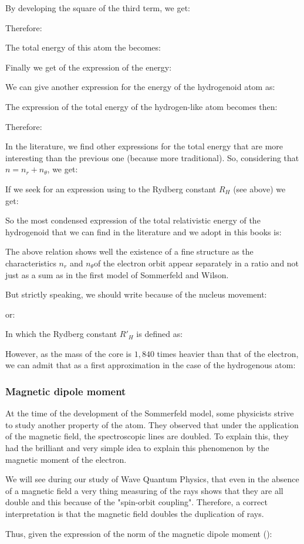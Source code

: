 	By developing the square of the third term, we get:
	
	Therefore:
	
	The total energy of this atom the becomes:
	
	Finally we get of the expression of the energy:
	
	We can give another expression for the energy of the hydrogenoid atom as:
	
	The expression of the total energy of the hydrogen-like atom becomes then:
	
	Therefore:
	
	In the literature, we find other expressions for the total energy that are more interesting than the previous one (because more traditional). So, considering that $n=n_r+n_\theta$, we get:
	
	If we seek for an expression using to the Rydberg constant $R_H$ (see above) we get:
	
	So the most condensed expression of the total relativistic energy of the hydrogenoid  that we can find in the literature and we adopt in this books is:
	
	The above relation shows well the existence of a fine structure as the characteristics $n_r$ and $n_\theta$of the electron orbit appear separately in a ratio and not just as a sum as in the first model of Sommerfeld and Wilson.
	
	But strictly speaking, we should write because of the nucleus movement:
	
	or:
	
	In which the Rydberg constant ${R'}_H$ is defined as:
	
	However, as the mass of the core is $1,840$ times heavier than that of the electron, we can admit that as a first approximation in the case of the hydrogenous atom:
	
	
	\pagebreak
	\subsubsection{Magnetic dipole moment}\label{magnetic dipole moment}
	At the time of the development of the Sommerfeld model, some physicists strive to study another property of the atom. They observed that under the application of the magnetic field, the spectroscopic lines are doubled. To explain this, they had the brilliant and very simple idea  to explain this phenomenon by the magnetic moment of the electron.
	\begin{tcolorbox}[title=Remark,colframe=black,arc=10pt]
	We will see during our study of Wave Quantum Physics, that even in the absence of a magnetic field a very thing measuring of the rays shows that they are all double and this because of the "spin-orbit coupling". Therefore, a correct interpretation is that the magnetic field doubles the duplication of rays.
	\end{tcolorbox}
	Thus, given the expression of the norm of the magnetic dipole moment ():
	
